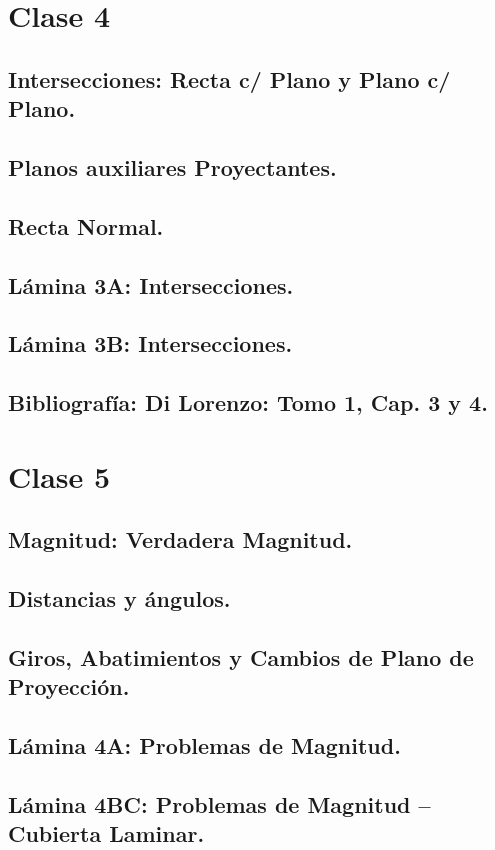 \documentclass[12pt]{book}
\begin{document}
\chapter{Clase 4}
\section{Intersecciones: Recta c/ Plano y Plano c/ Plano.}
\section{Planos auxiliares Proyectantes.}
\section{Recta Normal.}
\section{Lámina 3A: Intersecciones.}
\section{Lámina 3B: Intersecciones.}
\section{Bibliografía: Di Lorenzo: Tomo 1, Cap. 3 y 4.}

\chapter{Clase 5 }

\section{Magnitud: Verdadera Magnitud.}
\section{Distancias y ángulos.}
\section{Giros, Abatimientos y Cambios de Plano de Proyección.}
\section{Lámina 4A: Problemas de Magnitud.}
\section{Lámina 4BC: Problemas de Magnitud – Cubierta Laminar.}
\end{document}
